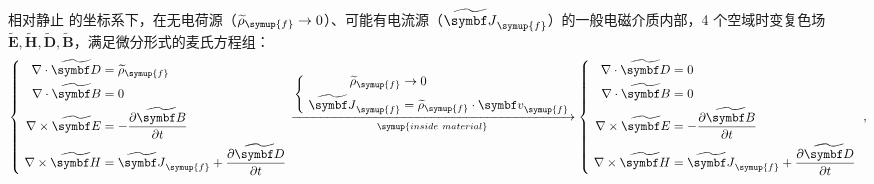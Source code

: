 相对静止 的坐标系下，在无电荷源（${\widetilde \rho}_{\symup{f}} \rightarrow 0$）、可能有电流源（$\widetilde{\symbf J}_{\symup{f}}$）的一般电磁介质内部，4 个空域时变复色场 
$ \widetilde{\symbf E}, \widetilde{\symbf H},  \widetilde{\symbf D}, \widetilde{\symbf B} $，满足微分形式的麦氏方程组：
\begin{equation} \label{eq:2-1}
	\left\{\ \begin{aligned}\nabla \cdot \widetilde{\symbf D} &= {\widetilde \rho}_{\symup{f}}  \\\nabla \cdot \widetilde{\symbf B} &= 0 \\\nabla \times \widetilde{\symbf E} &= - \frac{\partial \widetilde{\symbf B}}{\partial t} \\ \nabla \times \widetilde{\symbf H} &= \widetilde{\symbf J}_{\symup{f}} + \frac{\partial \widetilde{\symbf D}}{\partial t} \end{aligned}\right. \xrightarrow[{\symup{inside\ material}}]{\left\{\ \begin{aligned}{\widetilde \rho}_{\symup{f}} &\rightarrow 0  \\ \widetilde{\symbf J}_{\symup{f}} &= {\widetilde \rho}_{\symup{f}} \cdot {\symbf v}_{\symup{f}} \end{aligned}\right.} \left\{\ \begin{aligned}\nabla \cdot \widetilde{\symbf D} &= 0 \\\nabla \cdot \widetilde{\symbf B} &= 0 \\\nabla \times \widetilde{\symbf E} &= - \frac{\partial \widetilde{\symbf B}}{\partial t} \\ \nabla \times \widetilde{\symbf H} &= \widetilde{\symbf J}_{\symup{f}} + \frac{\partial \widetilde{\symbf D}}{\partial t} \end{aligned}\right. ~,
\end{equation}

